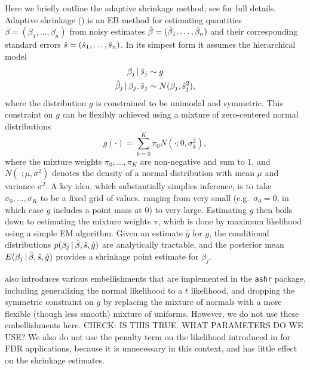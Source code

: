 \documentclass[12pt]{article}
\begin{document}
Here we briefly outline the adaptive shrinkage method; see \cite{stephens:2015} for full details.
Adaptive shrinkage (\ash) is an EB method
for estimating quantities $\beta=(\beta_1,\dots,\beta_n)$ from noisy estimates 
$\hat{\beta}=(\hat{\beta}_1,\dots,\hat{\beta}_n)$ and their corresponding standard errors $\hat{s} = (\hat{s}_1,\dots,\hat{s}_n)$. 
In its simpest form it assumes the hierarchical model
\begin{align}
\beta_j \,|\, \hat{s}_j & \sim g \\
\hat{\beta}_j \,|\, \beta_j, \hat{s}_j & \sim N(\beta_j, \hat{s}_j^2),
\end{align}
where the distribution $g$ is constrained to be unimodal and symmetric. This constraint on $g$ can
be flexibly achieved using 
a mixture of zero-centered normal distributions
\begin{equation}
g(\cdot)=\sum_{k=0}^K \pi_0 N(\cdot;0,\sigma_k^2),
\end{equation}
where the mixture weights $\pi_0,\dots,\pi_K$ are non-negative and sum to 1, and $N(\cdot; \mu,\sigma^2)$ denotes
the density of a normal distribution with mean $\mu$ and variance $\sigma^2$.
A key idea, which substantially simplies inference, is to take
$\sigma_0,\dots,\sigma_K$ to be a fixed grid of values. ranging from very small (e.g.~$\sigma_0=0$,
in which case $g$ includes a point mass at 0) to very large. Estimating $g$ then boils down to estimating
the mixture weights $\pi$, which is done by maximum likelihood using a simple EM algorithm.
Given an estimate $\hat{g}$ for $g$, the conditional distributions $p(\beta_j \,|\, \hat{\beta}, \hat{s}, \hat{g})$ are analytically
tractable, and the posterior mean $E(\beta_j \,|\, \hat{\beta}, \hat{s}, \hat{g})$ provides a shrinkage point estimate for $\beta_j$.

\cite{stephens:2015} also introduces various embellishments that are implemented in the {\tt ashr}
package, including generalizing the normal likelihood to a $t$ likelihood, and dropping the symmetric
constraint on $g$ by replacing the mixture
of normals with a more flexible (though less smooth) mixture of uniforms. However, we do not use these embellishments here. 
CHECK: IS THIS TRUE. WHAT PARAMETERS DO WE USE?
We also do not use the penalty term on the likelihood introduced in \cite{stephens:2015} for FDR applications,
because it is unnecessary in this context, and has little effect on the shrinkage estimates.

\end{document}
